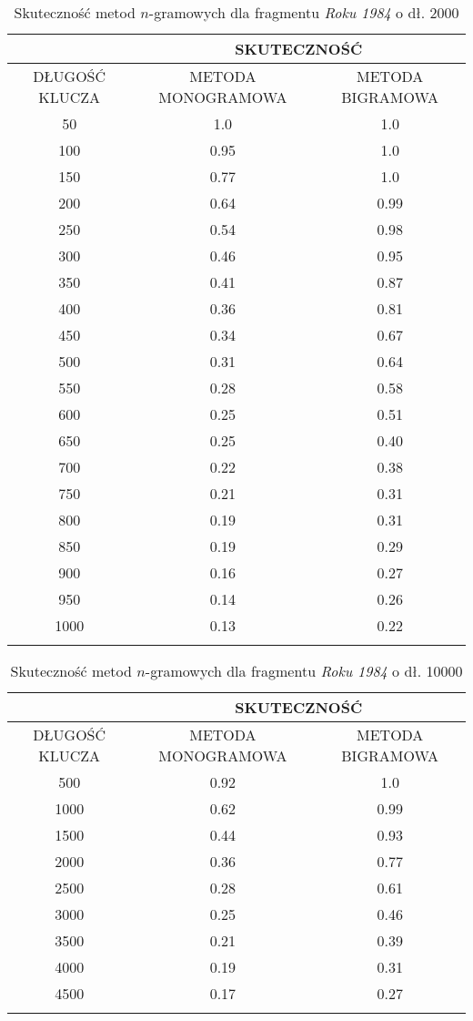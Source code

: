 \documentclass[a4paper]{article}
\theoremstyle{defn}
\theoremstyle{theorem}
\theoremstyle{lemma}
\theoremstyle{cor}
\theoremstyle{fact}
\begin{document}
\begin{center}\begin{longtable}{
|c|c|c|}
\hline &\multicolumn{2}{|c|}{SKUTECZNOŚĆ} \\ 
\hline DŁUGOŚĆ KLUCZA & METODA MONOGRAMOWA & METODA BIGRAMOWA\\ \hline
50
 & 1.0 & 1.0\\ \hline
100
 & 0.95 & 1.0\\ \hline
150
 & 0.77 & 1.0\\ \hline
200
 & 0.64 & 0.99\\ \hline
250
 & 0.54 & 0.98\\ \hline
300
 & 0.46 & 0.95\\ \hline
350
 & 0.41 & 0.87\\ \hline
400
 & 0.36 & 0.81\\ \hline
450
 & 0.34 & 0.67\\ \hline
500
 & 0.31 & 0.64\\ \hline
550
 & 0.28 & 0.58\\ \hline
600
 & 0.25 & 0.51\\ \hline
650
 & 0.25 & 0.40\\ \hline
700
 & 0.22 & 0.38\\ \hline
750
 & 0.21 & 0.31\\ \hline
800
 & 0.19 & 0.31\\ \hline
850
 & 0.19 & 0.29\\ \hline
900
 & 0.16 & 0.27\\ \hline
950
 & 0.14 & 0.26\\ \hline
1000
 & 0.13 & 0.22\\ \hline
   \caption{Skuteczność metod $n$-gramowych dla fragmentu \textit{Roku 1984} o dł. 2000}
\end{longtable}\end{center}

\begin{center}\begin{longtable}{
|c|c|c|}
\hline &\multicolumn{2}{|c|}{SKUTECZNOŚĆ} \\ 
\hline DŁUGOŚĆ KLUCZA & METODA MONOGRAMOWA & METODA BIGRAMOWA\\ \hline
500
 & 0.92 & 1.0\\ \hline
1000
 & 0.62 & 0.99\\ \hline
1500
 & 0.44 & 0.93\\ \hline
2000
 & 0.36 & 0.77\\ \hline
2500
 & 0.28 & 0.61\\ \hline
3000
 & 0.25 & 0.46\\ \hline
3500
 & 0.21 & 0.39\\ \hline
4000
 & 0.19 & 0.31\\ \hline
4500
 & 0.17 & 0.27\\ \hline
    \caption{Skuteczność metod $n$-gramowych dla fragmentu \textit{Roku 1984} o dł. 10000}
\end{longtable}\end{center}
\end{document}
